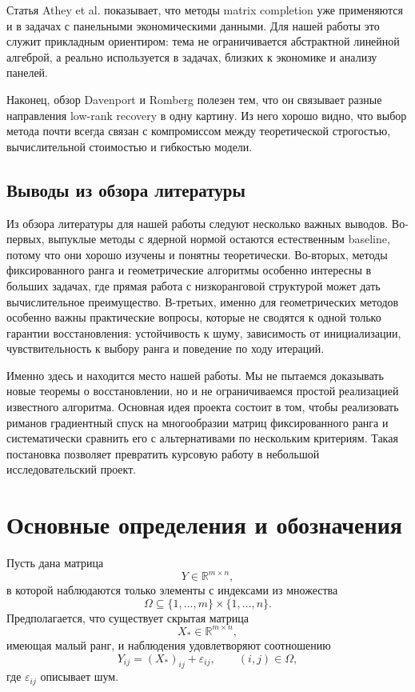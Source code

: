 \documentclass[a4paper,12pt]{article}
\newcommand{\R}{\mathbb{R}}
\begin{document}
Статья Athey et al. \cite{causal-panel} показывает, что методы matrix completion уже применяются и в задачах с панельными экономическими данными. Для нашей работы это служит прикладным ориентиром: тема не ограничивается абстрактной линейной алгеброй, а реально используется в задачах, близких к экономике и анализу панелей.

Наконец, обзор Davenport и Romberg \cite{overview} полезен тем, что он связывает разные направления low-rank recovery в одну картину. Из него хорошо видно, что выбор метода почти всегда связан с компромиссом между теоретической строгостью, вычислительной стоимостью и гибкостью модели.

\subsection{Выводы из обзора литературы}

Из обзора литературы для нашей работы следуют несколько важных выводов. Во-первых, выпуклые методы с ядерной нормой остаются естественным baseline, потому что они хорошо изучены и понятны теоретически. Во-вторых, методы фиксированного ранга и геометрические алгоритмы особенно интересны в больших задачах, где прямая работа с низкоранговой структурой может дать вычислительное преимущество. В-третьих, именно для геометрических методов особенно важны практические вопросы, которые не сводятся к одной только гарантии восстановления: устойчивость к шуму, зависимость от инициализации, чувствительность к выбору ранга и поведение по ходу итераций.

Именно здесь и находится место нашей работы. Мы не пытаемся доказывать новые теоремы о восстановлении, но и не ограничиваемся простой реализацией известного алгоритма. Основная идея проекта состоит в том, чтобы реализовать риманов градиентный спуск на многообразии матриц фиксированного ранга и систематически сравнить его с альтернативами по нескольким критериям. Такая постановка позволяет превратить курсовую работу в небольшой исследовательский проект.

\newpage

\section{Основные определения и обозначения}
\label{sec:definitions}

Пусть дана матрица
\[
Y \in \R^{m \times n},
\]
в которой наблюдаются только элементы с индексами из множества
\[
\Omega \subseteq \{1,\dots,m\} \times \{1,\dots,n\}.
\]
Предполагается, что существует скрытая матрица
\[
X_* \in \R^{m \times n},
\]
имеющая малый ранг, и наблюдения удовлетворяют соотношению
\[
Y_{ij} = (X_*)_{ij} + \varepsilon_{ij}, \qquad (i,j)\in\Omega,
\]
где $\varepsilon_{ij}$ описывает шум.
\end{document}
